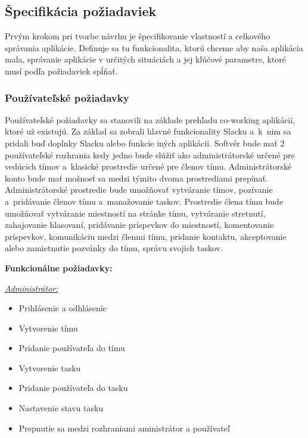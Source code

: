 \subsection{Špecifikácia požiadaviek}
\indent Prvým krokom pri tvorbe návrhu je špecifikovanie vlastností a celkového správania aplikácie. Definuje sa tu funkcionalita, ktorú chceme aby naša aplikácia mala, správanie aplikácie v určitých situáciách a jej kľúčové parametre, ktoré musí podľa požiadaviek spĺňať.
\subsubsection{Používateľské požiadavky} 
\indent Používateľské požiadavky sa stanovili na základe prehľadu co-working aplikácii, ktoré už existujú. Za základ sa zobrali hlavné funkcionality Slacku a k nim sa pridali buď doplnky Slacku alebo funkcie iných aplikácii. Softvér bude mať 2 používateľské rozhrania kedy jedno bude slúžiť ako administrátorské určené pre vedúcich tímov a klasické prostredie určené pre členov tímu. Administrátorské konto bude mať možnosť sa medzi týmito dvoma prostrediami prepínať. Administrátorské prostredie bude umožňovať vytváranie tímov, pozívanie a pridávanie členov tímu a manažovanie taskov. Prostredie člena tímu bude umožňovať vytváranie miestností na stránke tímu, vytváranie stretnutí, zahajovanie hlasovaní, pridávanie príspevkov do miestností, komentovanie príspevkov, komunikáciu medzi členmi tímu, pridanie kontaktu, akceptovanie alebo zamietnutie pozvánky do tímu, správu svojich taskov.

\textbf{Funkcionálne požiadavky:}

\underline{\textit{Administrátor:}}
\indent\begin{itemize}
    \item Prihlásenie a odhlásenie
    \item Vytvorenie tímu
    \item Pridanie používateľa do tímu
    \item Vytvorenie tasku
    \item Pridanie používateľa do tasku
    \item Nastavenie stavu tasku
    \item Prepnutie sa medzi rozhraniami aministrátor a používateľ
\end{itemize}


